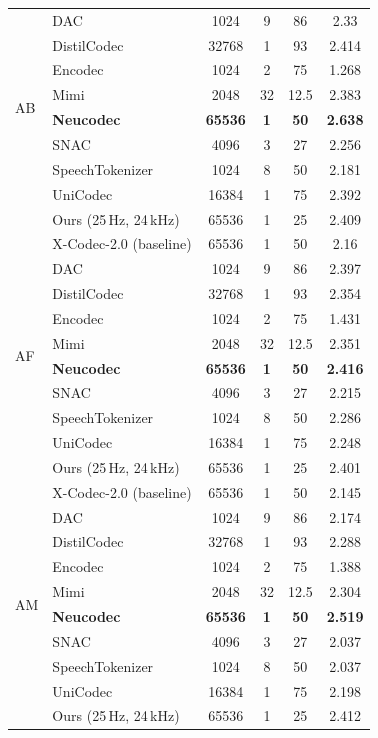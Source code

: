 \documentclass[preprint]{article}
\begin{document}
\begin{longtable}{llcccc}
\multirow{8}{*}{AB}
  & DAC & 1024 & 9 & 86 & 2.33 \\
  & DistilCodec & 32768 & 1 & 93 & 2.414 \\
  & Encodec & 1024 & 2 & 75 & 1.268 \\
  & Mimi & 2048 & 32 & 12.5 & 2.383 \\
  & \textbf{Neucodec} & \textbf{65536} & \textbf{1} & \textbf{50} & \textbf{2.638} \\
  & SNAC & 4096 & 3 & 27 & 2.256 \\
  & SpeechTokenizer & 1024 & 8 & 50 & 2.181 \\
  & UniCodec & 16384 & 1 & 75 & 2.392 \\
  & Ours (25\,Hz, 24\,kHz) & 65536 & 1 & 25 & 2.409 \\
  & X-Codec-2.0 (baseline) & 65536 & 1 & 50 & 2.16 \\
\midrule
\multirow{8}{*}{AF}
  & DAC & 1024 & 9 & 86 & 2.397 \\
  & DistilCodec & 32768 & 1 & 93 & 2.354 \\
  & Encodec & 1024 & 2 & 75 & 1.431 \\
  & Mimi & 2048 & 32 & 12.5 & 2.351 \\
  & \textbf{Neucodec} & \textbf{65536} & \textbf{1} & \textbf{50} & \textbf{2.416} \\
  & SNAC & 4096 & 3 & 27 & 2.215 \\
  & SpeechTokenizer & 1024 & 8 & 50 & 2.286 \\
  & UniCodec & 16384 & 1 & 75 & 2.248 \\
  & Ours (25\,Hz, 24\,kHz) & 65536 & 1 & 25 & 2.401 \\
  & X-Codec-2.0 (baseline) & 65536 & 1 & 50 & 2.145 \\
\midrule
\multirow{8}{*}{AM}
  & DAC & 1024 & 9 & 86 & 2.174 \\
  & DistilCodec & 32768 & 1 & 93 & 2.288 \\
  & Encodec & 1024 & 2 & 75 & 1.388 \\
  & Mimi & 2048 & 32 & 12.5 & 2.304 \\
  & \textbf{Neucodec} & \textbf{65536} & \textbf{1} & \textbf{50} & \textbf{2.519} \\
  & SNAC & 4096 & 3 & 27 & 2.037 \\
  & SpeechTokenizer & 1024 & 8 & 50 & 2.037 \\
  & UniCodec & 16384 & 1 & 75 & 2.198 \\
  & Ours (25\,Hz, 24\,kHz) & 65536 & 1 & 25 & 2.412 \\

\end{longtable}
\end{document}
